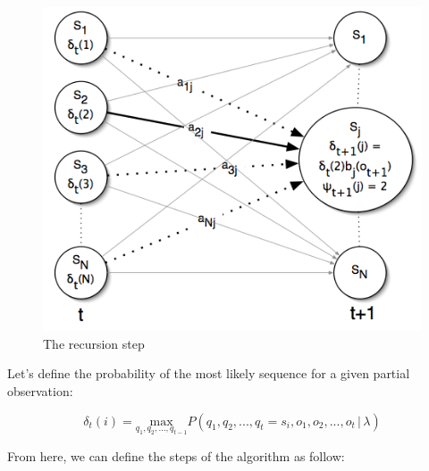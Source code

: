 \begin{figure}[!ht]
	\centering
	\includegraphics[scale=0.8]{Figures/hmm_recursion.png}
	\caption{The recursion step \cite{hmm_tutorial}}
	\label{fig:hmm_recursion}
\end{figure}

\noindent Let's define the probability of the most likely sequence for a given partial observation:

\begin{equation}
	\delta_{t}(i) =  \underset{q_{1},q_{2}, ... , q_{t-1}}{\mathrm{max}} P (q_{1},q_{2}, ... , q_{t} = s_{i}, o_{1}, o_{2}, ... , o_{t} \, | \, \lambda)
\end{equation}

\noindent From here, we can define the steps of the algorithm as follow:

